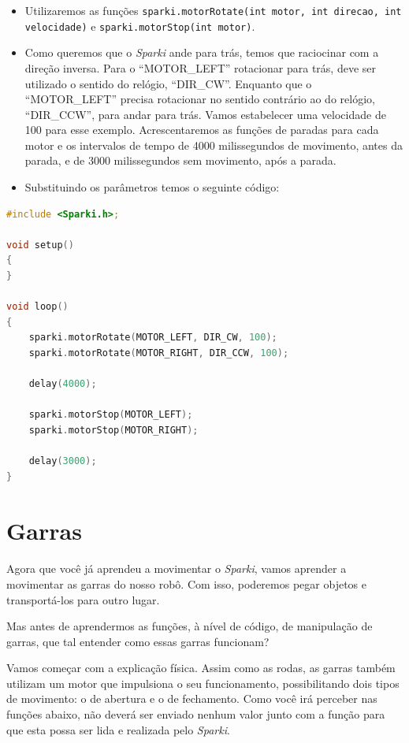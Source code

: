 \begin{itemize}
    \item Utilizaremos as funções \lstinline[columns=fixed]{sparki.motorRotate(int motor, int direcao, int } \\ \lstinline[columns=fixed]{velocidade)} e \lstinline[columns=fixed]{sparki.motorStop(int motor)}.
    \item Como queremos que o \textsl{Sparki} ande para trás, temos que raciocinar com a direção inversa. Para o ``MOTOR\_LEFT'' rotacionar para trás, deve ser utilizado o sentido do relógio, ``DIR\_CW''. Enquanto que o ``MOTOR\_LEFT'' precisa rotacionar no sentido contrário ao do relógio, ``DIR\_CCW'', para andar para trás. Vamos estabelecer uma velocidade de 100 para esse exemplo. Acrescentaremos as funções de paradas para cada motor e os intervalos de tempo de 4000 milissegundos de movimento, antes da parada, e de 3000 milissegundos sem movimento, após a parada.
    \item Substituindo os parâmetros temos o seguinte código:
\end{itemize}
    
    \begin{lstlisting}[language=C]
#include <Sparki.h>;

void setup()
{
}

void loop()
{
    sparki.motorRotate(MOTOR_LEFT, DIR_CW, 100);
    sparki.motorRotate(MOTOR_RIGHT, DIR_CCW, 100);
    
    delay(4000);
    
    sparki.motorStop(MOTOR_LEFT);
    sparki.motorStop(MOTOR_RIGHT);
    
    delay(3000);
}
\end{lstlisting}

\section{Garras}
\paragraph{}
Agora que você já aprendeu a movimentar o \textsl{Sparki}, vamos aprender a movimentar as garras do nosso robô. 
Com isso, poderemos pegar objetos e transportá-los para outro lugar.

Mas antes de aprendermos as funções, à nível de código, de manipulação de garras, que tal entender como essas garras funcionam?

Vamos começar com a explicação física. Assim como as rodas, as garras também utilizam um motor que impulsiona o seu funcionamento, possibilitando dois tipos de movimento: o de abertura e o de fechamento. Como você irá perceber nas funções abaixo, não deverá ser enviado nenhum valor junto com a função para que esta possa ser lida e realizada pelo \textsl{Sparki}.\\

